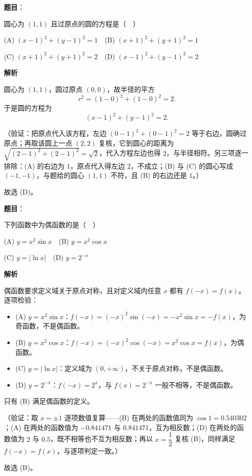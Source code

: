 \begin{answer}

\textbf{题目}：

圆心为 \((1,1)\) 且过原点的圆的方程是（　）

(A) \((x-1)^{2}+(y-1)^{2}=1\)　(B) \((x+1)^{2}+(y+1)^{2}=1\)

(C) \((x+1)^{2}+(y+1)^{2}=2\)　(D) \((x-1)^{2}+(y-1)^{2}=2\)

\textbf{解析}

圆心为 \((1,1)\)，圆过原点 \((0,0)\)，故半径的平方
\nopagebreak[4]
\[
r^{2}=(1-0)^{2}+(1-0)^{2}=2.
\]
于是圆的方程为
\nopagebreak[4]
\[
(x-1)^{2}+(y-1)^{2}=2.
\]

（验证：把原点代入该方程，左边 \((0-1)^{2}+(0-1)^{2}=2\) 等于右边，圆确过原点；再取该圆上一点 \((2,2)\) 复核，它到圆心的距离为 \(\sqrt{(2-1)^{2}+(2-1)^{2}}=\sqrt{2}\)，代入方程左边也得 \(2\)，与半径相符。另三项逐一排除：(A) 的右边为 \(1\)，原点代入得左边 \(2\)，不成立；(B) 与 (C) 的圆心写成 \((-1,-1)\)，与题给的圆心 \((1,1)\) 不符，且 (B) 的右边还是 \(1\)。）

故选 (D)。


\end{answer}
\begin{answer}

\textbf{题目}：

下列函数中为偶函数的是（　）

(A) \(y=x^{2}\sin x\)　(B) \(y=x^{2}\cos x\)

(C) \(y=|\ln x|\)　(D) \(y=2^{-x}\)

\textbf{解析}

偶函数要求定义域关于原点对称，且对定义域内任意 \(x\) 都有 \(f(-x)=f(x)\)。逐项检验：

\begin{itemize}
\item (A) \(y=x^{2}\sin x\)：\(f(-x)=(-x)^{2}\sin(-x)=-x^{2}\sin x=-f(x)\)，为奇函数，不是偶函数。
\item (B) \(y=x^{2}\cos x\)：\(f(-x)=(-x)^{2}\cos(-x)=x^{2}\cos x=f(x)\)，为偶函数。
\item (C) \(y=\left|\ln x\right|\)：定义域为 \((0,+\infty)\)，不关于原点对称，不是偶函数。
\item (D) \(y=2^{-x}\)：\(f(-x)=2^{x}\)，与 \(f(x)=2^{-x}\) 一般不相等，不是偶函数。
\end{itemize}

只有 (B) 满足偶函数的定义。

（验证：取 \(x=\pm1\) 逐项数值复算——(B) 在两处的函数值同为 \(\cos1=0.540302\)；(A) 在两处的函数值为 \(-0.841471\) 与 \(0.841471\)，互为相反数；(D) 在两处的函数值为 \(2\) 与 \(0.5\)，既不相等也不互为相反数；再以 \(x=\dfrac12\) 复核 (B)，同样满足 \(f(-x)=f(x)\)，与逐项判定一致。）

故选 (B)。


\end{answer}
